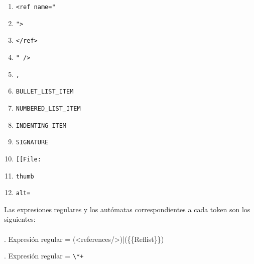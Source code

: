 \documentclass[a4paper,11pt]{article}
\begin{document}
\begin{center}
\begin{enumerate}
\item	\begin{verbatim}<ref name="\end{verbatim} 
\item	\begin{verbatim}">\end{verbatim}
\item	\begin{verbatim}</ref>\end{verbatim} 
\item	\begin{verbatim}" />\end{verbatim} 
\item	\begin{verbatim}, \end{verbatim}
\item	\begin{verbatim}BULLET_LIST_ITEM\end{verbatim} 
\item	\begin{verbatim}NUMBERED_LIST_ITEM\end{verbatim} 
\item	\begin{verbatim}INDENTING_ITEM\end{verbatim} 
\item	\begin{verbatim}SIGNATURE\end{verbatim}
\item	\begin{verbatim}[[File:\end{verbatim}
\item	\begin{verbatim}thumb\end{verbatim}
\item	\begin{verbatim}alt=\end{verbatim}
\end{enumerate}
\end{center}

Las expresiones regulares y los aut\'omatas correspondientes a cada token son los siguientes:
\\\\

.
Expresi\'on regular = (<references/>)|(\{\{Reflist\}\})

.
Expresi\'on regular = \verb|\*+|
\end{document}

